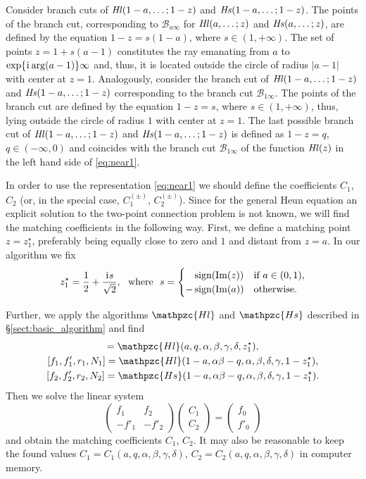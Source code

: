 \documentclass[11pt]{article}
\newcommand{\MF}[1]{\mathop{#1}\nolimits}
\newcommand{\ii}{\kern0.05em\mathrm{i}\kern0.05em} \newcommand{\E}[1]{\textrm{e}^{#1}}
\newcommand{\sign}{\mathop{\textrm{sign}}}
\newcommand{\BCone}{\mathscr{B}_{1\infty}}%
\newcommand{\BCa}{\mathscr{B}_{a\infty}}
\def\HeunL{\MF{\textit{Hl\/}}}%
\def\HeunS{\MF{\textit{Hs\/}}}%
\def\psHeunLfin{\mathpzc{Hl}}%
\def\psHeunSfin{\mathpzc{Hs}}%
\def\midpoint#1{z^\star_{#1}}%
\begin{document}
Consider branch cuts of $\HeunL(1-a,\ldots;1-z)$ and $\HeunS(1-a,\ldots;1-z)$.
The points of the branch cut, corresponding to $\BCa$ for $\HeunL(a,\ldots;z)$
and $\HeunS(a,\ldots;z)$, are defined by the equation $1-z=s(1-a)$, where
$s\in(1,+\infty)$. The set of points $z=1+s(a-1)$ constitutes the ray emanating
from $a$ to $\exp\{\ii\arg(a-1)\}\infty$ and, thus, it is located outside the
circle of radius $|a-1|$ with center at $z=1$. Analogously, consider the branch
cut of $\HeunL(1-a,\ldots;1-z)$ and $\HeunS(1-a,\ldots;1-z)$ corresponding to
the branch cut $\BCone$. The points of the branch cut are defined by the
equation $1-z=s$, where $s\in(1,+\infty)$, thus, lying outside the circle of
radius $1$ with center at $z=1$. The last possible branch cut of
$\HeunL(1-a,\ldots;1-z)$ and $\HeunS(1-a,\ldots;1-z)$ is defined as $1-z=q$,
$q\in(-\infty,0)$ and coincides with the branch cut $\BCone$ of the function
$\HeunL(z)$ in the left hand side of \eqref{eq:near1}.

In order to use the representation \eqref{eq:near1} we should define the
coefficients $C_1$, $C_2$ (or, in the special case, $C^{(\pm)}_1$,
$C^{(\pm)}_2$). Since for the general Heun equation an explicit solution to the
two-point connection problem is not known, we will find the matching
coefficients in the following way. First, we define a matching point
$z=\midpoint{1}$, preferably being equally close to zero and $1$ and distant
from $z=a$. In our algorithm we fix
\[
\midpoint{1} = \frac12 + \frac{\ii s}{\sqrt{2}},\ \ \mbox{where}\ \
s=\begin{cases}\phantom{-}\sign(\Im(z)) & \textrm{if}\ a\in(0,1),\\
 -\sign(\Im(a)) &
\textrm{otherwise}.\end{cases}
\]

Further, we apply the algorithms $\psHeunLfin$ and $\psHeunSfin$ described in
\S\;\ref{sect:basic_algorithm} and find
\begin{gather*}
 [f_0,f'_0,r_0,N_0]=\psHeunLfin(a,q,\alpha,\beta,\gamma,\delta,\midpoint{1}),\\
 [f_1,f'_1,r_1,N_1]=\psHeunLfin(1-a,\alpha\beta-q,\alpha,\beta,\delta,\gamma,1-\midpoint{1}),\\ 
 [f_2,f'_2,r_2,N_2]=\psHeunSfin(1-a,\alpha\beta-q,\alpha,\beta,\delta,\gamma,1-\midpoint{1}). 
\end{gather*}
Then we solve the linear system
\[
\left(\begin{matrix} f_1 & f_2\\
 -f'_1 & -f'_2
\end{matrix}\right)
\left(\begin{matrix}
C_1\\C_2
\end{matrix}\right)=
\left(\begin{matrix}
f_0\\f'_0
\end{matrix}\right)
\]
and obtain the matching coefficients $C_1$, $C_2$. It may also be reasonable to
keep the found values $C_1=C_1(a,q,\alpha,\beta,\gamma,\delta)$,
$C_2=C_2(a,q,\alpha,\beta,\gamma,\delta)$ in computer memory.
\end{document}
